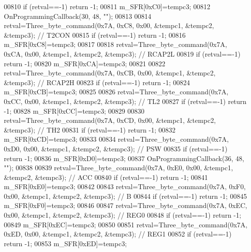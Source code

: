 \begin{DoxyCode}
{{{{{{{{{{{{{{{00810     \textcolor{keywordflow}{if} (retval==-1) \textcolor{keywordflow}{return} -1;
00811     m_SFR[0xC0]=tempc3;
00812         OnProgrammingCallback(30, 48, \textcolor{stringliteral}{""});
00813 
00814     retval=Three_byte_command(0x7A, 0xC8, 0x00, &tempc1, &tempc2, &tempc3); \textcolor{comment}{// T2CON}
00815     \textcolor{keywordflow}{if} (retval==-1) \textcolor{keywordflow}{return} -1;
00816     m_SFR[0xC8]=tempc3;
00817 
00818     retval=Three_byte_command(0x7A, 0xCA, 0x00, &tempc1, &tempc2, &tempc3); \textcolor{comment}{// RCAP2L}
00819     \textcolor{keywordflow}{if} (retval==-1) \textcolor{keywordflow}{return} -1;
00820     m_SFR[0xCA]=tempc3;
00821 
00822     retval=Three_byte_command(0x7A, 0xCB, 0x00, &tempc1, &tempc2, &tempc3); \textcolor{comment}{// RCAP2H}
00823     \textcolor{keywordflow}{if} (retval==-1) \textcolor{keywordflow}{return} -1;
00824     m_SFR[0xCB]=tempc3;
00825 
00826     retval=Three_byte_command(0x7A, 0xCC, 0x00, &tempc1, &tempc2, &tempc3); \textcolor{comment}{// TL2}
00827     \textcolor{keywordflow}{if} (retval==-1) \textcolor{keywordflow}{return} -1;
00828     m_SFR[0xCC]=tempc3;
00829 
00830     retval=Three_byte_command(0x7A, 0xCD, 0x00, &tempc1, &tempc2, &tempc3); \textcolor{comment}{// TH2}
00831     \textcolor{keywordflow}{if} (retval==-1) \textcolor{keywordflow}{return} -1;
00832     m_SFR[0xCD]=tempc3;
00833 
00834     retval=Three_byte_command(0x7A, 0xD0, 0x00, &tempc1, &tempc2, &tempc3); \textcolor{comment}{// PSW}
00835     \textcolor{keywordflow}{if} (retval==-1) \textcolor{keywordflow}{return} -1;
00836         m_SFR[0xD0]=tempc3;
00837         OnProgrammingCallback(36, 48, \textcolor{stringliteral}{""});
00838 
00839     retval=Three_byte_command(0x7A, 0xE0, 0x00, &tempc1, &tempc2, &tempc3); \textcolor{comment}{// ACC}
00840     \textcolor{keywordflow}{if} (retval==-1) \textcolor{keywordflow}{return} -1;
00841         m_SFR[0xE0]=tempc3;
00842 
00843     retval=Three_byte_command(0x7A, 0xF0, 0x00, &tempc1, &tempc2, &tempc3); \textcolor{comment}{// B}
00844     \textcolor{keywordflow}{if} (retval==-1) \textcolor{keywordflow}{return} -1;
00845     m_SFR[0xF0]=tempc3;
00846 
00847     retval=Three_byte_command(0x7A, 0xEC, 0x00, &tempc1, &tempc2, &tempc3); \textcolor{comment}{// REG0}
00848     \textcolor{keywordflow}{if} (retval==-1) \textcolor{keywordflow}{return} -1;
00849         m_SFR[0xEC]=tempc3;
00850 
00851     retval=Three_byte_command(0x7A, 0xED, 0x00, &tempc1, &tempc2, &tempc3); \textcolor{comment}{// REG1}
00852     \textcolor{keywordflow}{if} (retval==-1) \textcolor{keywordflow}{return} -1;
00853     m_SFR[0xED]=tempc3;
}}}}}}}}}}}}}}}
\end{DoxyCode}

